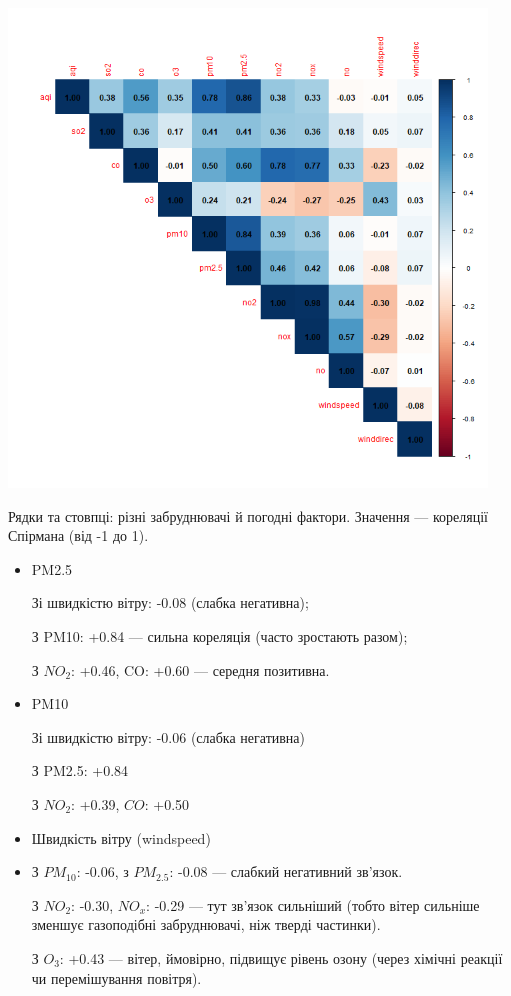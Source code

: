 \documentclass{article}
\begin{document}
\begin{enumerate}
    \includegraphics[width=5in]{plots/question1/corr_matrix_plot.png}

    Рядки та стовпці: різні забруднювачі й погодні фактори. Значення — кореляції Спірмана (від -1 до 1).
    \begin{itemize}
        \item PM2.5

        Зі швидкістю вітру: -0.08 (слабка негативна);

        З PM10: +0.84 — сильна кореляція (часто зростають разом);

        З $NO_2$: +0.46, CO: +0.60 — середня позитивна.
    \item PM10
 
        Зі швидкістю вітру: -0.06 (слабка негативна)

        З PM2.5: +0.84

        З $NO_2$: +0.39, $CO$: +0.50

    \item Швидкість вітру (windspeed)
    \item 
        З $PM_{10}$: -0.06, з $PM_{2.5}$: -0.08 — слабкий негативний зв'язок.

        З $NO_2$: -0.30, $NO_x$: -0.29 — тут зв'язок сильніший (тобто вітер сильніше зменшує газоподібні забруднювачі, ніж тверді частинки).

        З $O_3$: +0.43 — вітер, ймовірно, підвищує рівень озону (через хімічні реакції чи перемішування повітря).
    \end{itemize}   


\end{enumerate}
\end{document}
